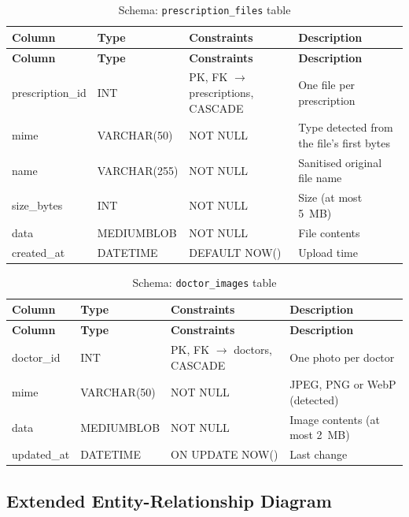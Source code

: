\begin{longtable}{|L{3.3cm}|L{2.5cm}|L{2.4cm}|L{4.6cm}|}
\caption{Schema: \texttt{prescription\_files} table} \label{tab:presfiles} \\
\hline
\textbf{Column} & \textbf{Type} & \textbf{Constraints} & \textbf{Description} \\
\hline
\endfirsthead
\hline
\textbf{Column} & \textbf{Type} & \textbf{Constraints} & \textbf{Description} \\
\hline
\endhead
\hline
\endfoot
prescription\_id & INT & PK, FK $\rightarrow$ prescriptions, CASCADE & One file per prescription \\
\hline
mime & VARCHAR(50) & NOT NULL & Type detected from the file's first bytes \\
\hline
name & VARCHAR(255) & NOT NULL & Sanitised original file name \\
\hline
size\_bytes & INT & NOT NULL & Size (at most 5~MB) \\
\hline
data & MEDIUMBLOB & NOT NULL & File contents \\
\hline
created\_at & DATETIME & DEFAULT NOW() & Upload time \\
\hline
\end{longtable}
\begin{longtable}{|L{3.3cm}|L{2.5cm}|L{2.4cm}|L{4.6cm}|}
\caption{Schema: \texttt{doctor\_images} table} \label{tab:docimages} \\
\hline
\textbf{Column} & \textbf{Type} & \textbf{Constraints} & \textbf{Description} \\
\hline
\endfirsthead
\hline
\textbf{Column} & \textbf{Type} & \textbf{Constraints} & \textbf{Description} \\
\hline
\endhead
\hline
\endfoot
doctor\_id & INT & PK, FK $\rightarrow$ doctors, CASCADE & One photo per doctor \\
\hline
mime & VARCHAR(50) & NOT NULL & JPEG, PNG or WebP (detected) \\
\hline
data & MEDIUMBLOB & NOT NULL & Image contents (at most 2~MB) \\
\hline
updated\_at & DATETIME & ON UPDATE NOW() & Last change \\
\hline
\end{longtable}


\subsection{Extended Entity-Relationship Diagram}
\label{sec:er-ext}

